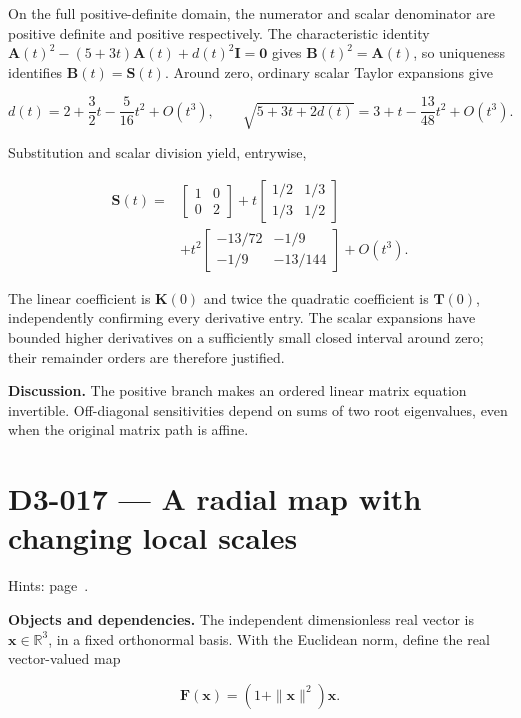 \documentclass[11pt,oneside,openany]{book}
\begin{document}
On the full positive-definite domain, the numerator and scalar denominator are positive definite and positive respectively. The characteristic identity \(\mathbf A(t)^2-(5+3t)\mathbf A(t)+d(t)^2\mathbf I=\mathbf0\) gives \(\mathbf B(t)^2=\mathbf A(t)\), so uniqueness identifies \(\mathbf B(t)=\mathbf S(t)\). Around zero, ordinary scalar Taylor expansions give

\[
d(t)=2+\frac32t-\frac5{16}t^2+O(t^3),\qquad
\sqrt{5+3t+2d(t)}=3+t-\frac{13}{48}t^2+O(t^3).
\]

Substitution and scalar division yield, entrywise,

\[
\begin{aligned}
\mathbf S(t)
={}&\begin{bmatrix}1&0\\0&2\end{bmatrix}
+t\begin{bmatrix}1/2&1/3\\1/3&1/2\end{bmatrix}\\
&+t^2\begin{bmatrix}-13/72&-1/9\\-1/9&-13/144\end{bmatrix}+O(t^3).
\end{aligned}
\]

The linear coefficient is \(\mathbf K(0)\) and twice the quadratic coefficient is \(\mathbf T(0)\), independently confirming every derivative entry. The scalar expansions have bounded higher derivatives on a sufficiently small closed interval around zero; their remainder orders are therefore justified.

\textbf{Discussion.} The positive branch makes an ordered linear matrix equation invertible. Off-diagonal sensitivities depend on sums of two root eigenvalues, even when the original matrix path is affine.
\clearpage
\section{D3-017 --- A radial map with changing local scales}
\label{problem:D3-017}
{\small Hints: page~\pageref{hints:D3-017}.}\par\medskip

\textbf{Objects and dependencies.} The independent dimensionless real vector is \(\mathbf x\in\mathbb R^3\), in a fixed orthonormal basis. With the Euclidean norm, define the real vector-valued map

\[
\mathbf F(\mathbf x)=(1+\|\mathbf x\|^2)\mathbf x.
\]
\end{document}
